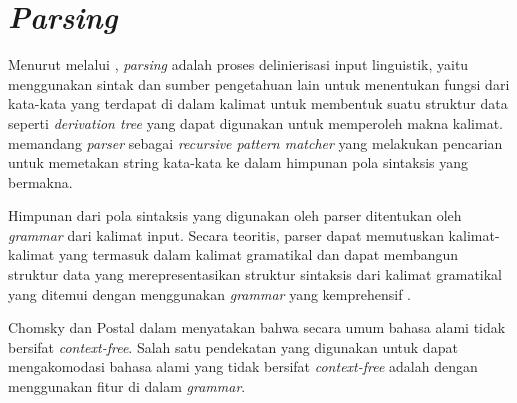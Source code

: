 \section{\emph{Parsing}}
Menurut \citet{bar_feigenbaum} melalui \citet{suryawan}, \emph{parsing} adalah proses delinierisasi input linguistik, yaitu menggunakan sintak dan sumber pengetahuan lain untuk menentukan fungsi dari kata-kata yang terdapat di dalam kalimat untuk membentuk suatu struktur data seperti \emph{derivation tree} yang dapat digunakan untuk memperoleh makna kalimat. \citet{bar_feigenbaum} memandang \emph{parser} sebagai \emph{recursive pattern matcher} yang melakukan pencarian untuk memetakan string kata-kata ke dalam himpunan pola sintaksis yang bermakna.

Himpunan dari pola sintaksis yang digunakan oleh parser ditentukan oleh \emph{grammar} dari kalimat input. Secara teoritis, parser dapat memutuskan kalimat-kalimat yang termasuk dalam kalimat gramatikal dan dapat membangun struktur data yang merepresentasikan struktur sintaksis dari kalimat gramatikal yang ditemui dengan menggunakan \emph{grammar} yang kemprehensif \citep{bar_feigenbaum}.

Chomsky dan Postal dalam \citet{bar_feigenbaum} menyatakan bahwa secara umum bahasa alami tidak bersifat \emph{context-free}. Salah satu pendekatan yang digunakan untuk dapat mengakomodasi bahasa alami yang tidak bersifat \emph{context-free} adalah dengan menggunakan fitur di dalam \emph{grammar}.